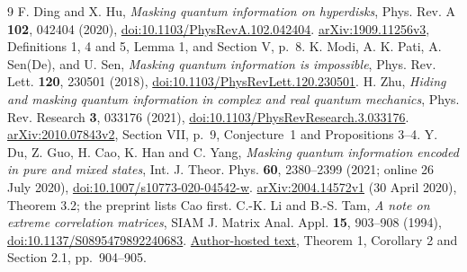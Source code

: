 \documentclass[11pt]{article}
\begin{document}
\begin{thebibliography}{9}
F. Ding and X. Hu, \emph{Masking quantum information on hyperdisks},
Phys. Rev. A \textbf{102}, 042404 (2020),
\href{https://doi.org/10.1103/PhysRevA.102.042404}{doi:10.1103/PhysRevA.102.042404}.
\href{https://arxiv.org/abs/1909.11256v3}{arXiv:1909.11256v3},
Definitions 1, 4 and 5, Lemma 1, and Section V, p.~8.
K. Modi, A. K. Pati, A. Sen(De), and U. Sen,
\emph{Masking quantum information is impossible},
Phys. Rev. Lett. \textbf{120}, 230501 (2018),
\href{https://doi.org/10.1103/PhysRevLett.120.230501}{doi:10.1103/PhysRevLett.120.230501}.
H. Zhu, \emph{Hiding and masking quantum information in complex and real
quantum mechanics}, Phys. Rev. Research \textbf{3}, 033176 (2021),
\href{https://doi.org/10.1103/PhysRevResearch.3.033176}{doi:10.1103/PhysRevResearch.3.033176}.
\href{https://arxiv.org/abs/2010.07843v2}{arXiv:2010.07843v2},
Section VII, p.~9, Conjecture~1 and Propositions 3--4.
Y. Du, Z. Guo, H. Cao, K. Han and C. Yang,
\emph{Masking quantum information encoded in pure and mixed states},
Int. J. Theor. Phys. \textbf{60}, 2380--2399 (2021; online 26 July 2020),
\href{https://doi.org/10.1007/s10773-020-04542-w}{doi:10.1007/s10773-020-04542-w}.
\href{https://arxiv.org/abs/2004.14572v1}{arXiv:2004.14572v1}
(30 April 2020), Theorem 3.2; the preprint lists Cao first.
C.-K. Li and B.-S. Tam, \emph{A note on extreme correlation matrices},
SIAM J. Matrix Anal. Appl. \textbf{15}, 903--908 (1994),
\href{https://doi.org/10.1137/S0895479892240683}{doi:10.1137/S0895479892240683}.
\href{https://cklixx.people.wm.edu/corr.pdf}{Author-hosted text},
Theorem 1, Corollary 2 and Section 2.1, pp.~904--905.
\end{thebibliography}
\end{document}
